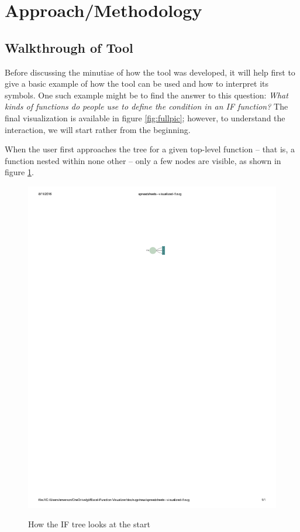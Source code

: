 \documentclass[conference]{IEEEtran}
\begin{document}
	\section{Approach/Methodology} \subsection{Walkthrough of Tool} Before
	discussing the minutiae of how the tool was developed, it will help first to
	give a basic example of how the tool can be used and how to interpret its
	symbols. One such example might be to find the answer to this question:
	\textit{ What kinds of functions do people use to define the condition in an IF
		function?} The final visualization is available in figure \ref{fig:fullpic};
	however, to understand the interaction, we will start rather from the
	beginning. \par
	
	When the user first approaches the tree for a given top-level function -- that
	is, a function nested within none other -- only a few nodes are visible, as
	shown in figure \ref{fig:startpic}. \par
	
	\begin{figure}
		\centering
		\includegraphics{start}
		\label{fig:startpic}
		\caption{How the IF tree looks at the start}
	\end{figure}
	
\end{document}
